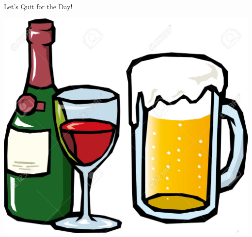 \documentclass[notes=hide,12pt,xcolor=dvipsnames%
   ]{beamer}
\theoremstyle{definition}
\begin{document}
\begin{frame}[label=pau]{}
\begin{center}

Let's Quit for the Day!

\bigskip\bigskip
\includegraphics[scale=.4]{drinks}
\end{center}
\end{frame}

\end{document}
